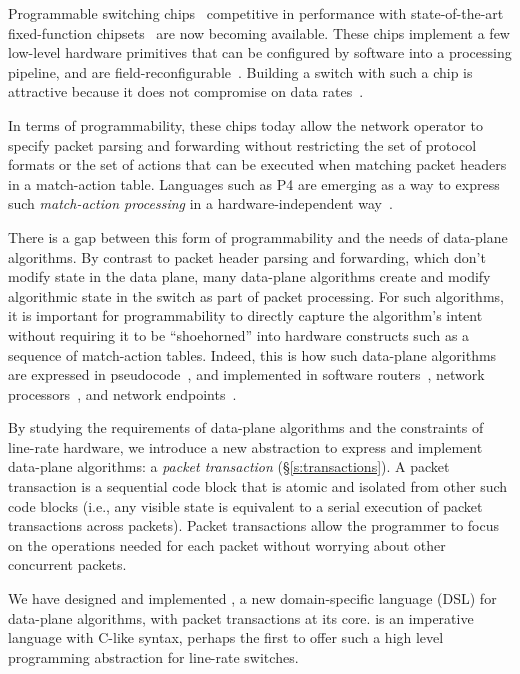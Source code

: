 Programmable switching chips~\cite{flexpipe, xpliant, rmt, corsa,
  uadp, algo_logic} competitive in performance with state-of-the-art
fixed-function chipsets~\cite{trident, tomahawk, mellanox} are now
becoming available. These chips implement a few low-level hardware
primitives that can be configured by software into a processing
pipeline, and are
field-reconfigurable~\cite{xpliant_sdk,xpliant_sdk2,intel_sdk}. Building
a switch with such a chip is attractive because it does not compromise
on data rates~\cite{rmt}.

In terms of programmability, these chips today allow the network
operator to specify packet parsing and forwarding without restricting
the set of protocol formats or the set of actions that can be executed
when matching packet headers in a match-action table. Languages such
as P4 are emerging as a way to express such {\em match-action
  processing} in a hardware-independent way~\cite{p4,p4spec,dc_p4}.

There is a gap between this form of programmability and the needs of data-plane
algorithms. By contrast to packet header parsing and forwarding, which don't
modify state in the data plane, many data-plane algorithms create and modify
algorithmic state in the switch as part of packet processing. For such
algorithms, it is important for programmability to directly capture the
algorithm's intent without requiring it to be ``shoehorned'' into hardware
constructs such as a sequence of match-action tables. Indeed, this is how such
data-plane algorithms are expressed in pseudocode~\cite{red, csfq, codel_code,
avq, blue}, and implemented in software routers~\cite{click, dpdk,
routebricks}, network processors~\cite{packetc, nova}, and network
endpoints~\cite{qdisc}.

By studying the requirements of data-plane algorithms and the
constraints of line-rate hardware, we introduce a new abstraction to
express and implement data-plane algorithms: a {\em packet
  transaction} (\S\ref{s:transactions}). A packet transaction is a
sequential code block that is atomic and isolated from other such code
blocks (i.e., any visible state is equivalent to a serial execution of
packet transactions across packets). Packet transactions allow the programmer to
focus on the operations needed for each packet without worrying about
other concurrent packets.

We have designed and implemented {\em \pktlanguage{}}, a new
domain-specific language (DSL) for data-plane algorithms, with packet
transactions at its core.  \pktlanguage is an imperative language with
C-like syntax, perhaps the first to offer such a high level
programming abstraction for line-rate switches.

